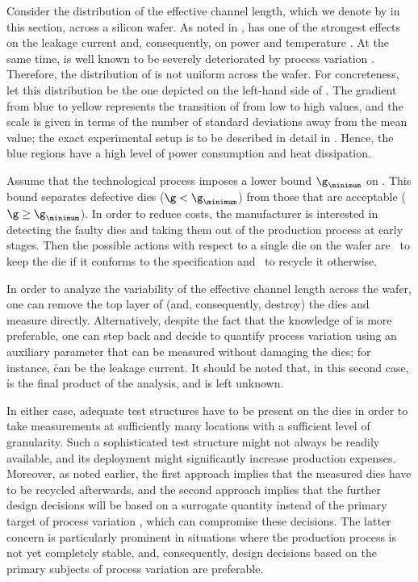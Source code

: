 Consider the distribution of the effective channel length, which we denote by \g
in this section, across a silicon wafer. As noted in , \g has
one of the strongest effects on the leakage current and, consequently, on power
and temperature \cite{juan2012}. At the same time, \g is well known to be
severely deteriorated by process variation \cite{chandrakasan2000,
srivastava2010}. Therefore, the distribution of \g is not uniform across the
wafer. For concreteness, let this distribution be the one depicted on the
left-hand side of . The gradient from blue to yellow
represents the transition of \g from low to high values, and the scale is given
in terms of the number of standard deviations away from the mean value; the
exact experimental setup is to be described in detail in
. Hence, the blue regions have a high level of power
consumption and heat dissipation.

Assume that the technological process imposes a lower bound $\g_\minimum$ on \g.
This bound separates defective dies ($\g < \g_\minimum$) from those that are
acceptable ($\g \geq \g_\minimum$). In order to reduce costs, the manufacturer
is interested in detecting the faulty dies and taking them out of the production
process at early stages. Then the possible actions with respect to a single die
on the wafer are \one~to keep the die if it conforms to the specification and
\two~to recycle it otherwise.

In order to analyze the variability of the effective channel length \g across
the wafer, one can remove the top layer of (and, consequently, destroy) the dies
and measure \g directly. Alternatively, despite the fact that the knowledge of
\g is more preferable, one can step back and decide to quantify process
variation using an auxiliary parameter \h that can be measured without damaging
the dies; for instance, \h can be the leakage current. It should be noted that,
in this second case, \h is the final product of the analysis, and \g is left
unknown.

In either case, adequate test structures have to be present on the dies in order
to take measurements at sufficiently many locations with a sufficient level of
granularity. Such a sophisticated test structure might not always be readily
available, and its deployment might significantly increase production expenses.
Moreover, as noted earlier, the first approach implies that the measured dies
have to be recycled afterwards, and the second approach implies that the further
design decisions will be based on a surrogate quantity \h instead of the primary
target of process variation \g, which can compromise these decisions. The latter
concern is particularly prominent in situations where the production process is
not yet completely stable, and, consequently, design decisions based on the
primary subjects of process variation are preferable.

